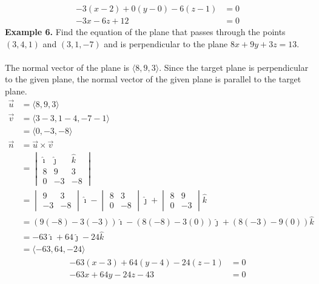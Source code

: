 \vspace{-3.5em}
\begin{align*}
    -3(x - 2) + 0(y - 0) - 6(z - 1) & = 0 \\
    -3x - 6z + 12                   & = 0
\end{align*}
\newpage
\noindent\textbf{Example 6. } Find the equation of the plane that passes through the points $(3, 4, 1)$ and $(3, 1, -7)$ and is perpendicular to the plane $8x + 9y + 3z  = 13$.
~\\\\
The normal vector of the plane is $\langle 8, 9, 3 \rangle$. Since the target plane is perpendicular to the given plane, the normal vector of the given plane is parallel to the target plane.
\begin{align*}
    \vec{u} & = \langle 8, 9, 3 \rangle                                                          \\
    \vec{v} & = \langle 3 - 3, 1 - 4, -7 - 1 \rangle                                             \\
            & = \langle 0, -3, -8 \rangle                                                        \\
    \vec{n} & = \vec{u} \times \vec{v}                                                           \\
            & = \begin{vmatrix}
                    \hat{\imath} & \hat{\jmath} & \hat{k} \\
                    8            & 9            & 3       \\
                    0            & -3           & -8
                \end{vmatrix}                        \\
            & = \begin{vmatrix}
                    9  & 3  \\
                    -3 & -8
                \end{vmatrix}\hat{\imath} - \begin{vmatrix}
                                                8 & 3  \\
                                                0 & -8
                                            \end{vmatrix}\hat{\jmath} + \begin{vmatrix}
                                                                            8 & 9  \\
                                                                            0 & -3
                                                                        \end{vmatrix}\hat{k}     \\
            & = (9(-8) - 3(-3))\hat{\imath} - (8(-8) - 3(0))\hat{\jmath} + (8(-3) - 9(0))\hat{k} \\
            & = -63\hat{\imath} + 64\hat{\jmath} - 24\hat{k}                                     \\
            & = \langle -63, 64, -24 \rangle
\end{align*}
\vspace{-3.5em}
\begin{align*}
    -63(x - 3) + 64(y - 4) - 24(z - 1) & = 0 \\
    -63x + 64y - 24z - 43              & = 0
\end{align*}
